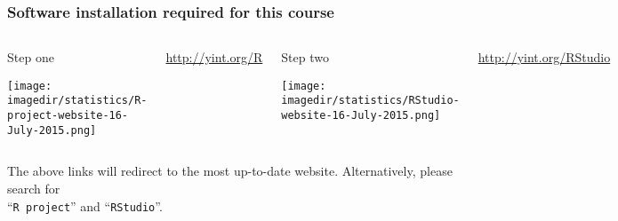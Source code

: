 \begin{frame}\frametitle{Software installation required for this course}
	\begin{columns}[b]
			
			\begin{exampleblock}{\color{red}Step one}
				
				\vspace{10pt}
				\centerline{\texttt{[image: \\imagedir/statistics/R-project-website-16-July-2015.png]}}
			\end{exampleblock}
			
			\vfill
			
			\href{http://yint.org/R}{http://yint.org/R}
		
		
			\begin{exampleblock}{\color{red}Step two}
				\centerline{\texttt{[image: \\imagedir/statistics/RStudio-website-16-July-2015.png]}}
			\end{exampleblock}
			
			\vfill
			\href{http://yint.org/RStudio}{http://yint.org/RStudio}
	\end{columns}
	
	\vspace{6pt}
	\small
	The above links will redirect to the most up-to-date website. Alternatively, please search for\\ ``\texttt{R project}'' and ``\texttt{RStudio}''.
		
\end{frame}

{
\begin{frame}\frametitle{}
\end{frame}}

